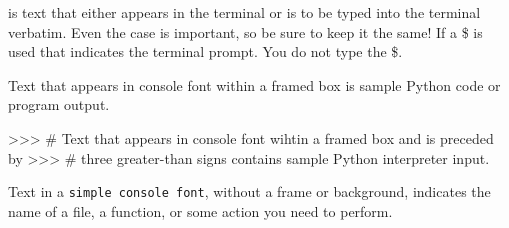 \documentclass[11pt]{cselabheader}
\begin{document}

is text that either appears in the terminal or is to be typed into the terminal
verbatim. Even the case is important, so be sure to keep it the same! If a \$ is
used that indicates the terminal prompt. You do not type the \$.

\begin{python3code}
Text that appears in console font within a framed box is sample Python code
or program output.
\end{python3code}

\begin{pyconcode}
>>> # Text that appears in console font wihtin a framed box and is preceded by
>>> # three greater-than signs contains sample Python interpreter input.
\end{pyconcode}

Text in a \texttt{simple console font}, without a frame or background, indicates
the name of a file, a function, or some action you need to perform.



\end{document}
